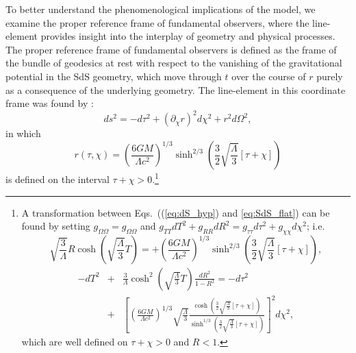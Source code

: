 \documentclass[aps,rmp,groupedaddress,twocolumn,10pt]{revtex4-2}
\begin{document}
To better understand the phenomenological implications of the model, we examine the proper reference frame of fundamental observers, where the line-element provides insight into the interplay of geometry and physical processes. The proper reference frame of fundamental observers is defined as the frame of the bundle of geodesics at rest with respect to the vanishing of the gravitational potential in the SdS geometry, which move through $t$ over the course of $r$ purely as a consequence of the underlying geometry. The line-element in this coordinate frame was found by \citet{Janzen2015}:
\begin{equation}
    ds^2=-d\tau^2+(\partial_{\chi}r)^2d\chi^2+r^2d\Omega^2,\label{eq:SdS_flat}
\end{equation}
in which
\begin{equation}
    r(\tau,\chi)=\left(\frac{6GM}{\Lambda c^2}\right)^{1/3}\sinh^{2/3}\left(\frac{3}{2}\sqrt{\frac{\Lambda}{3}}[\tau+\chi]\right)\label{eq:r_SdS}
\end{equation}
is defined on the interval $\tau+\chi>0$.\footnote{A transformation between Eqs.~((\ref{eq:dS_hyp}) and \ref{eq:SdS_flat}) can be found by setting $g_{\Omega\Omega}=g_{\Omega\Omega}$ and $g_{TT}dT^2+g_{RR}dR^2=g_{\tau\tau}d\tau^2+g_{\chi\chi}d\chi^2$; i.e.
\begin{equation}
    \sqrt{\frac{3}{\Lambda}}R\cosh\left(\sqrt{\frac{\Lambda}{3}}T\right)=+\left(\frac{6GM}{\Lambda c^2}\right)^{1/3}\sinh^{2/3}\left(\frac{3}{2}\sqrt{\frac{\Lambda}{3}}[\tau+\chi]\right),
\end{equation}
\begin{eqnarray}
    -dT^2&+&\frac{3}{\Lambda}\cosh^2\left(\sqrt{\frac{\Lambda}{3}}T\right)\frac{dR^2}{1-R^2}=-d\tau^2\\\nonumber~&+&\left[\left(\frac{6GM}{\Lambda c^2}\right)^{1/3}\sqrt{\frac{\Lambda}{3}}\frac{\cosh\left(\frac{3}{2}\sqrt{\frac{\Lambda}{3}}[\tau+\chi]\right)}{\sinh^{1/3}\left(\frac{3}{2}\sqrt{\frac{\Lambda}{3}}[\tau+\chi]\right)}\right]^2d\chi^2,
\end{eqnarray}
which are well defined on $\tau+\chi>0$ and $R<1$.}
\end{document}
